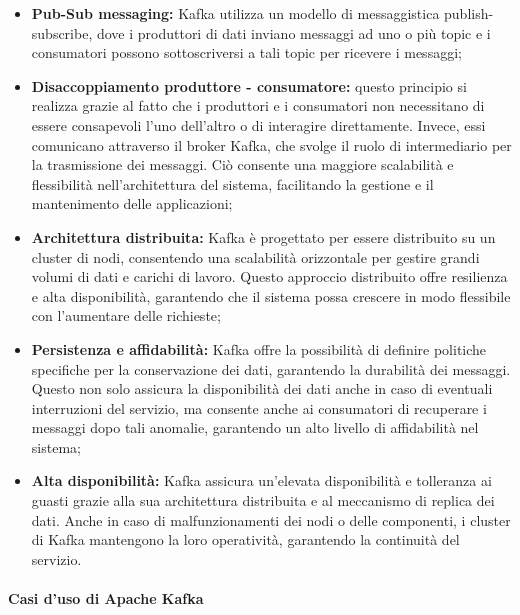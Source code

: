 \begin{itemize}
  \item \textbf{Pub-Sub messaging:} Kafka utilizza un modello di messaggistica publish-subscribe, dove i produttori di dati inviano messaggi ad uno o più topic e i consumatori possono sottoscriversi a tali topic per ricevere i messaggi;
  
  \item \textbf{Disaccoppiamento produttore - consumatore:} questo principio si realizza grazie al fatto che i produttori e i consumatori non necessitano di essere consapevoli l'uno dell'altro o di interagire direttamente. Invece, essi comunicano attraverso il broker Kafka, che svolge il ruolo di intermediario per la trasmissione dei messaggi. Ciò consente una maggiore scalabilità e flessibilità nell'architettura del sistema, facilitando la gestione e il mantenimento delle applicazioni;
  
  \item \textbf{Architettura distribuita:} Kafka è progettato per essere distribuito su un cluster di nodi, consentendo una scalabilità orizzontale per gestire grandi volumi di dati e carichi di lavoro. Questo approccio distribuito offre resilienza e alta disponibilità, garantendo che il sistema possa crescere in modo flessibile con l'aumentare delle richieste;
  
  \item \textbf{Persistenza e affidabilità:} Kafka offre la possibilità di definire politiche specifiche per la conservazione dei dati, garantendo la durabilità dei messaggi. Questo non solo assicura la disponibilità dei dati anche in caso di eventuali interruzioni del servizio, ma consente anche ai consumatori di recuperare i messaggi dopo tali anomalie, garantendo un alto livello di affidabilità nel sistema;
  
  \item \textbf{Alta disponibilità:} Kafka assicura un'elevata disponibilità e tolleranza ai guasti grazie alla sua architettura distribuita e al meccanismo di replica dei dati. Anche in caso di malfunzionamenti dei nodi o delle componenti, i cluster di Kafka mantengono la loro operatività, garantendo la continuità del servizio.
\end{itemize}

\paragraph{Casi d'uso di Apache Kafka}

